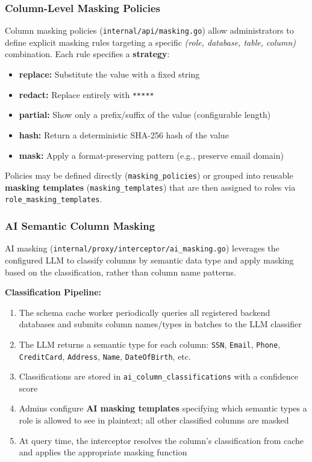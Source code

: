 \subsubsection{Column-Level Masking Policies}

Column masking policies (\texttt{internal/api/masking.go}) allow administrators to define explicit masking rules targeting a specific \textit{(role, database, table, column)} combination. Each rule specifies a \textbf{strategy}:

\begin{itemize}[leftmargin=*]
    \item \textbf{replace:} Substitute the value with a fixed string
    \item \textbf{redact:} Replace entirely with \texttt{*****}
    \item \textbf{partial:} Show only a prefix/suffix of the value (configurable length)
    \item \textbf{hash:} Return a deterministic SHA-256 hash of the value
    \item \textbf{mask:} Apply a format-preserving pattern (e.g., preserve email domain)
\end{itemize}

Policies may be defined directly (\texttt{masking\_policies}) or grouped into reusable \textbf{masking templates} (\texttt{masking\_templates}) that are then assigned to roles via \texttt{role\_masking\_templates}.

\subsubsection{AI Semantic Column Masking}

AI masking (\texttt{internal/proxy/interceptor/ai\_masking.go}) leverages the configured LLM to classify columns by semantic data type and apply masking based on the classification, rather than column name patterns.

\textbf{Classification Pipeline:}
\begin{enumerate}[leftmargin=*]
    \item The schema cache worker periodically queries all registered backend databases and submits column names/types in batches to the LLM classifier
    \item The LLM returns a semantic type for each column: \texttt{SSN}, \texttt{Email}, \texttt{Phone}, \texttt{CreditCard}, \texttt{Address}, \texttt{Name}, \texttt{DateOfBirth}, etc.
    \item Classifications are stored in \texttt{ai\_column\_classifications} with a confidence score
    \item Admins configure \textbf{AI masking templates} specifying which semantic types a role is allowed to see in plaintext; all other classified columns are masked
    \item At query time, the interceptor resolves the column's classification from cache and applies the appropriate masking function
\end{enumerate}

